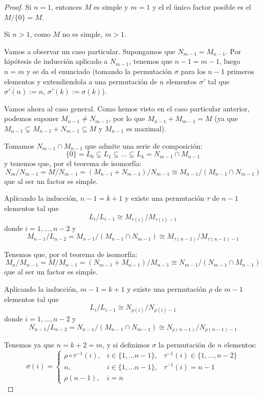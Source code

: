 \begin{proof}
  Si \(n=1\), entonces \(M\) es simple y \(m=1\) y el el único factor posible
  es el \(M/\{0\}=M\).

  Si \(n>1\), como \(M\) no es simple, \(m>1\).

  Vamos a observar un caso particular. Supongamos que \(N_{m-1}
  =M_{n-1}\). Por hipótesis de inducción aplicado a \(N_{m-1}\),
  tenemos que  \(n-1=m-1\), luego \(n=m\) y se da el enunciado
  (tomando la permutación \(\sigma\) para los \(n-1\) primeros elementos
  y extendiendola a una permutación de \(n\) elementos \(\sigma'\) tal
  que \(\sigma'(n):=n\), \(\sigma'(k):=\sigma(k)\)).

  Vamos ahora al caso general. Como hemos visto
  en el caso particular anterior, podemos suponer
  \(M_{n-1}\neq N_{m-1}\), por lo que
  \(M_{n-1}+M_{m-1}=M\) (ya que \(M_{n-1}\subsetneq M_{n-1}+
  N_{m-1}\subseteq M\) y \(M_{n-1}\) es maximal).

  Tomamos \(N_{m-1}\cap M_{n-1}\) que admite una serie de composición:
  \[
    \{0\}=L_0\subsetneq L_1\subsetneq\ldots\subsetneq L_k
    =N_{m-1}\cap M_{n-1}
  \]
  y tenemos que, por el teorema de isomorfía:
  \[
    N_m/N_{m-1}=
    M/N_{m-1}=
    (M_{n-1}+N_{m-1})/N_{m-1}\cong M_{n-1}/(M_{n-1}\cap N_{m-1})
  \]
  que al ser un factor es simple.

  Aplicando la inducción, \(n-1=k+1\) y existe una permutación
  \(\tau\) de \(n-1\) elementos tal que
  \[
    L_i/L_{i-1}\cong M_{\tau(i)}/M_{\tau(i)-1}
  \]
  donde \(i=1,\ldots, n-2\)
  y
  \[
    M_{n-1}/L_{n-2}=M_{n-1}/(M_{n-1}\cap N_{m-1})\cong
    M_{\tau(n-1)}/M_{\tau(n-1)-1}
  \]

  Tenemos que, por el teorema de isomorfía:
  \[
    M_n/M_{n-1}=
    M/M_{n-1}=
    (N_{m-1}+M_{n-1})/M_{n-1}\cong N_{m-1}/(N_{m-1}\cap M_{n-1})
  \]
  que al ser un factor es simple.

  Aplicando la inducción, \(m-1=k+1\) y existe una permutación
  \(\rho\) de \(m-1\) elementos tal que
  \[
    L_i/L_{i-1}\cong N_{\rho(i)}/N_{\rho(i)-1}
  \]
  donde \(i=1,\ldots, n-2\)
  y
  \[
    N_{n-1}/L_{n-2}=N_{n-1}/(M_{n-1}\cap N_{m-1})\cong
    N_{\rho(n-1)}/N_{\rho(n-1)-1}
  \]

  Tenemos ya que \(n=k+2=m\), y si definimos \(\sigma\) la permutación
  de \(n\) elementos:
  \[
    \sigma(i)=\left\{
      \begin{matrix}
        \rho\circ\tau^{-1}(i),
        &i\in\{1,\ldots n-1\}, &\tau^{-1}(i)\in\{1,\ldots, n-2\}\\
        n,
        &i\in\{1,\ldots n-1\}, &\tau^{-1}(i)=n-1\\
        \rho(n-1),
        &i=n &
      \end{matrix}
      \right.
  \]
\end{proof}

